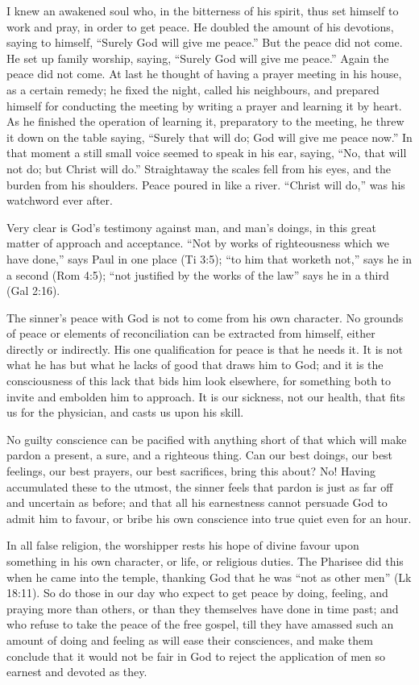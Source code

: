 \documentclass[
]{book}
\begin{document}
I knew an awakened soul who, in the bitterness of his spirit, thus set himself to work and pray, in order to get peace. He doubled the amount of his devotions, saying to himself, ``Surely God will give me peace.'' But the peace did not come. He set up family worship, saying, ``Surely God will give me peace.'' Again the peace did not come. At last he thought of having a prayer meeting in his house, as a certain remedy; he fixed the night, called his neighbours, and prepared himself for conducting the meeting by writing a prayer and learning it by heart. As he finished the operation of learning it, preparatory to the meeting, he threw it down on the table saying, ``Surely that will do; God will give me peace now.'' In that moment a still small voice seemed to speak in his ear, saying, ``No, that will not do; but Christ will do.'' Straightaway the scales fell from his eyes, and the burden from his shoulders. Peace poured in like a river. ``Christ will do,'' was his watchword ever after.

Very clear is God's testimony against man, and man's doings, in this great matter of approach and acceptance. ``Not by works of righteousness which we have done,'' says Paul in one place (Ti 3:5); ``to him that worketh not,'' says he in a second (Rom 4:5); ``not justified by the works of the law'' says he in a third (Gal 2:16).

The sinner's peace with God is not to come from his own character. No grounds of peace or elements of reconciliation can be extracted from himself, either directly or indirectly. His one qualification for peace is that he needs it. It is not what he has but what he lacks of good that draws him to God; and it is the consciousness of this lack that bids him look elsewhere, for something both to invite and embolden him to approach. It is our sickness, not our health, that fits us for the physician, and casts us upon his skill.

No guilty conscience can be pacified with anything short of that which will make pardon a present, a sure, and a righteous thing. Can our best doings, our best feelings, our best prayers, our best sacrifices, bring this about? No! Having accumulated these to the utmost, the sinner feels that pardon is just as far off and uncertain as before; and that all his earnestness cannot persuade God to admit him to favour, or bribe his own conscience into true quiet even for an hour.

In all false religion, the worshipper rests his hope of divine favour upon something in his own character, or life, or religious duties. The Pharisee did this when he came into the temple, thanking God that he was ``not as other men'' (Lk 18:11). So do those in our day who expect to get peace by doing, feeling, and praying more than others, or than they themselves have done in time past; and who refuse to take the peace of the free gospel, till they have amassed such an amount of doing and feeling as will ease their consciences, and make them conclude that it would not be fair in God to reject the application of men so earnest and devoted as they.
\end{document}
